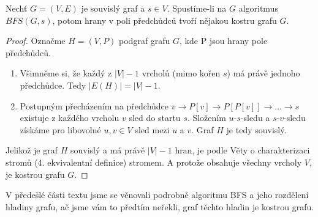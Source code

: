 \begin{theorem}
Nechť $G = (V, E)$ je souvislý graf a $s \in V$. Spustíme-li na $G$ algoritmus $BFS(G, s)$, potom hrany v poli předchůdců tvoří nějakou kostru grafu $G$.
\end{theorem}

\begin{proof}
Označme $H = (V, P)$ podgraf grafu $G$, kde P jsou hrany pole předchůdců.
\begin{enumerate}
    \item Všimněme si, že každý z $|V| - 1$ vrcholů (mimo kořen $s$) má právě jednoho předchůdce. Tedy $|E(H)| = |V| - 1$.
    \item Postupným přecházením na předchůdce $v \to P[v] \to P[P[v]] \to \dots \to s$ existuje z každého vrcholu $v$ sled do startu $s$. Složením $u$-$s$-sledu a $s$-$v$-sledu získáme pro libovolné $u, v \in V$ sled mezi $u$ a $v$. Graf $H$ je tedy souvislý.
\end{enumerate}
Jelikož je graf $H$ souvislý a má právě $|V| - 1$ hran, je podle Věty o charakterizaci stromů (4. ekvivalentní definice) stromem. A protože obsahuje všechny vrcholy $V$, je kostrou grafu $G$.
\end{proof}

\begin{remark}
 V předešlé části textu jsme se věnovali podrobně algoritmu BFS a jeho rozdělení hladiny grafu, ač jsme vám to předtím neřekli, graf těchto hladin je kostrou grafu.
\end{remark}



